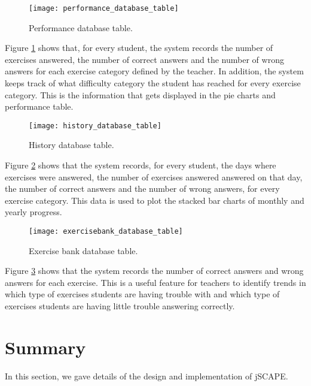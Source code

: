 \begin{figure}[H]
\centering
\texttt{[image: performance\_database\_table]}
\caption{Performance database table.}
\label{fig:performance_database_table}
\end{figure}

Figure \ref{fig:performance_database_table} shows that, for every student, the system records the number of exercises answered, the number of correct answers and the number of wrong answers for each exercise category defined by the teacher. In addition, the system keeps track of what difficulty category the student has reached for every exercise category. This is the information that gets displayed in the pie charts and performance table.

\begin{figure}[H]
\centering
\texttt{[image: history\_database\_table]}
\caption{History database table.}
\label{fig:history_database_table}
\end{figure}

Figure \ref{fig:history_database_table} shows that the system records, for every student, the days where exercises were answered, the number of exercises answered answered on that day, the number of correct answers and the number of wrong answers, for every exercise category. This data is used to plot the stacked bar charts of monthly and yearly progress.

\begin{figure}[H]
\centering
\texttt{[image: exercisebank\_database\_table]}
\caption{Exercise bank database table.}
\label{fig:exercisebank_database_table}
\end{figure}

Figure \ref{fig:exercisebank_database_table} shows that the system records the number of correct answers and wrong answers for each exercise. This is a useful feature for teachers to identify trends in which type of exercises students are having trouble with and which type of exercises students are having little trouble answering correctly.

\section{Summary}
In this section, we gave details of the design and implementation of jSCAPE.\newline

